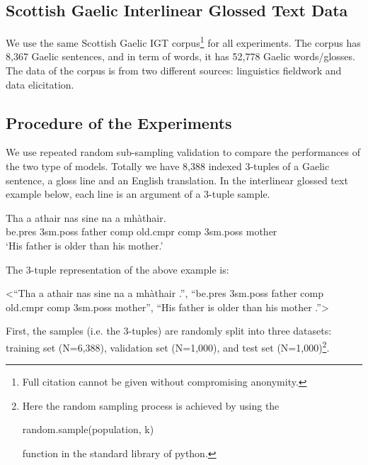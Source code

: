 \documentclass[11pt,a4paper]{article}
\begin{document}
\subsection{Scottish Gaelic Interlinear Glossed Text Data}
We use the same Scottish Gaelic IGT corpus\footnote{Full citation cannot be given without compromising anonymity.} for all experiments. The corpus has 8,367 Gaelic sentences, and in term of words, it has 52,778 Gaelic words/glosses. The data of the corpus is from two different sources: linguistics fieldwork and data elicitation.

\subsection{Procedure of the Experiments}
We use repeated random sub-sampling validation to compare the performances of the two type of models.
Totally we have 8,388 indexed 3-tuples of a Gaelic sentence, a gloss line and an English translation. In the interlinear glossed text example below, each line is an argument of a 3-tuple sample.

\begin{exe} 
\ex \gll    Tha a athair nas sine na a mh\`athair.\\ 
           be.pres 3sm.poss father comp old.cmpr comp 3sm.poss mother
\\ 
   \glt    `His father is older than his mother.' 
\end{exe}

The 3-tuple representation of the above example is:
\begin{exe}
\ex <``Tha a athair nas sine na a mh\`athair .'', ``be.pres 3sm.poss father comp old.cmpr comp 3sm.poss mother'', ``His father is older than his mother .''>
\end{exe}

First, the samples (i.e. the 3-tuples) are randomly split into three datasets: training set (N=6,388), validation set (N=1,000), and test set (N=1,000)\footnote{Here the random sampling process is achieved by using the \begin{myfont}random.sample(population, k)\end{myfont} function in the standard library of python.}.
\end{document}
